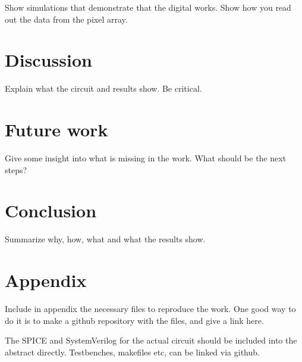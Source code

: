 \documentclass[paper,10pt,a4paper]{IEEEtran}
\begin{document}
Show simulations that demonstrate that the digital works. Show how you read out the data from the pixel array.

\section{Discussion}
Explain what the circuit and results show. Be critical.

\section{Future work}
Give some insight into what is missing in the work. What should be the next steps?

\section{Conclusion}
Summarize why, how, what and what the results show.

\section{Appendix}
Include in appendix the necessary files to reproduce the work. One good way to
do it is to make a github repository with the files, and give a link here.

The SPICE and SystemVerilog for the actual circuit should be included into the
abstract directly. Testbenches, makefiles etc, can be linked via github.
\end{document}
